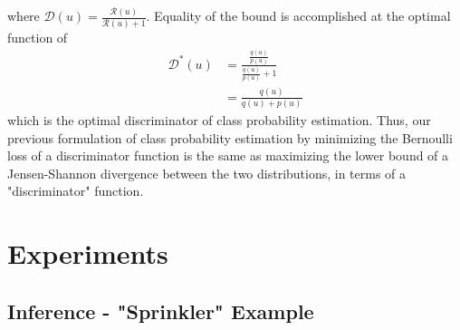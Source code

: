 \documentclass[a4paper,12pt]{article}
\numberwithin{equation}{section}
\begin{document}
where $\mathcal{D}(u)=\frac{\mathcal{R}(u)}{\mathcal{R}(u)+1}$. Equality of the bound is accomplished at the optimal function of
\begin{align*}
\mathcal{D}^*(u)&=\frac{\frac{q(u)}{p(u)}}{\frac{q(u)}{p(u)}+1}\\
&=\frac{q(u)}{q(u)+p(u)}
\end{align*}
which is the optimal discriminator of class probability estimation. Thus, our previous formulation of class probability estimation by minimizing the Bernoulli loss of a discriminator function is the same as maximizing the lower bound of a Jensen-Shannon divergence between the two distributions, in terms of a "discriminator" function.
\newpage
\section{Experiments}
\subsection{Inference - "Sprinkler" Example}
\end{document}
